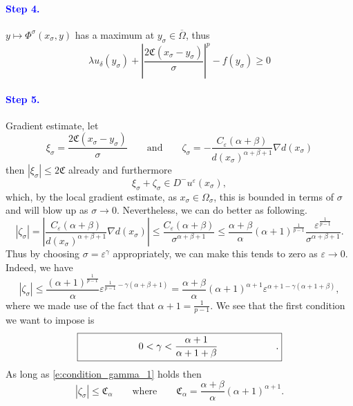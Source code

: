 \documentclass[11pt,reqno]{amsart}
\numberwithin{figure}{section}
\theoremstyle{plain}
\theoremstyle{remark}
\numberwithin{equation}{section}
\begin{document}
\paragraph{\textcolor{blue}{\textbf{Step 4.}}} $y\mapsto \Phi^\sigma(x_\sigma,y)$ has a maximum at $y_\sigma\in \overline{\Omega}$, thus 
\begin{equation*}
    \lambda u_\delta(y_\sigma) + \left|\frac{2\mathfrak{C}(x_\sigma-y_\sigma)}{\sigma}\right|^p - f(y_\sigma) \geq 0
\end{equation*}
\paragraph{\textcolor{blue}{\textbf{Step 5.}}} Gradient estimate, let
\begin{equation*}
    \xi_\sigma = \frac{2\mathfrak{C}(x_\sigma-y_\sigma)}{\sigma} \qquad\text{and}\qquad \zeta_\sigma = - \frac{C_\varepsilon(\alpha+\beta)}{d(x_\sigma)^{\alpha+\beta+1}}\nabla d(x_\sigma)
\end{equation*}
then $|\xi_\sigma|\leq 2\mathfrak{C}$ already and furthermore
\begin{equation*}
   \xi_\sigma+\zeta_\sigma \in D^-u^\varepsilon(x_\sigma),
\end{equation*}
which, by the local gradient estimate, as $x_\sigma\in \Omega_{\sigma}$, this is bounded in terms of $\sigma$ and will blow up as $\sigma\to 0$. Nevertheless, we can do better as following.
\begin{equation*}
 |\zeta_\sigma|=   \left|\frac{C_\varepsilon(\alpha+\beta)}{d(x_\sigma)^{\alpha+\beta+1}}\nabla d(x_\sigma )\right| \leq \frac{C_\varepsilon(\alpha+\beta)}{\sigma^{\alpha+\beta+1}}\leq \frac{\alpha+\beta}{\alpha} (\alpha+1)^\frac{1}{p-1}\frac{\varepsilon^\frac{1}{p-1}}{\sigma^{\alpha+\beta+1}}.
\end{equation*}
Thus by choosing $\sigma = \varepsilon^\gamma$ appropriately, we can make this tends to zero as $\varepsilon \to 0$. Indeed, we have
\begin{equation*}
    |\zeta_\sigma| \leq \frac{(\alpha+1)^\frac{1}{p-1}}{\alpha} \varepsilon^{\frac{1}{p-1} - \gamma(\alpha+\beta+1)} = \frac{\alpha+\beta}{\alpha}(\alpha+1)^{\alpha+1}\varepsilon^{\alpha+1 - \gamma(\alpha+1+\beta)},
\end{equation*}
where we made use of the fact that $\alpha+1 = \frac{1}{p-1}$. We see that the first condition we want to impose is
\begin{equation}\label{e:condition_gamma_1}
    \fbox{\qquad\qquad\qquad$\displaystyle 0 < \gamma < \frac{\alpha+1}{\alpha+1+\beta}$\qquad\qquad\qquad.}
\end{equation}
As long as \eqref{e:condition_gamma_1} holds then
\begin{equation}\label{e:bddp_sigmaq_sigma}
    |\zeta_\sigma|\leq \mathfrak{C}_\alpha \qquad\text{where}\qquad \mathfrak{C}_\alpha = \frac{\alpha+\beta}{\alpha}(\alpha+1)^{\alpha+1}.
\end{equation}
\end{document}

